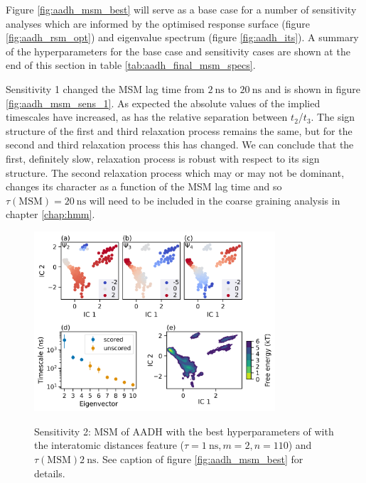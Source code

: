Figure \ref{fig:aadh_msm_best} will serve as a base case for a number of sensitivity analyses which are informed by the optimised response surface (figure \ref{fig:aadh_rsm_opt}) and eigenvalue spectrum (figure \ref{fig:aadh_its}). A summary of the hyperparameters for the base case and sensitivity cases are shown at the end of this section in table \ref{tab:aadh_final_msm_specs}. 

Sensitivity 1 changed the MSM lag time from $\SI{2}{\nano\second}$ to $\SI{20}{\nano\second}$ and is shown in figure \ref{fig:aadh_msm_sens_1}. As expected the absolute values of the implied timescales have increased, as has the relative separation between $t_{2}$/$t_{3}$. 
The sign structure of the first and third relaxation process remains the same, but for the second and third relaxation process this has changed.  We can conclude that the first, definitely slow, relaxation process is robust with respect to its sign structure. The second relaxation process which may or may not be dominant, changes its character as a function of the MSM lag time and so  $\tau(\mathrm{MSM}) = \SI{20}{\nano\second}$ will need to be included in the coarse graining analysis in chapter \ref{chap:hmm}. 

\begin{figure}
    \centering
    \caption{Sensitivity 2: MSM of AADH with the best hyperparameters of with the interatomic distances feature ($\tau = \SI{1}{\nano\second}, m=2, n=110$) and $\tau(\mathrm{MSM}) \SI{2}{\nano\second}$. See caption of figure \ref{fig:aadh_msm_best} for details.}
    \includegraphics[width=0.8\textwidth]{chapters/msm_optimization/figures/aadh_msm_sens_2.png}
    \label{fig:aadh_msm_sens_2}
\end{figure}


